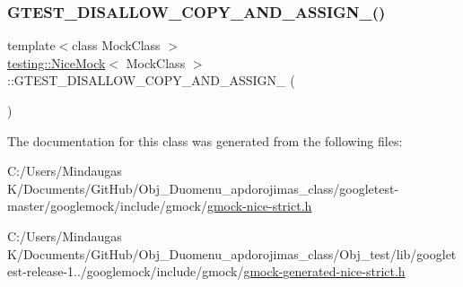 \mbox{\label{classtesting_1_1_nice_mock_aee46eca734708818a8af94624eb512dd}} 
\subsubsection{\texorpdfstring{GTEST\_DISALLOW\_COPY\_AND\_ASSIGN\_()}{GTEST\_DISALLOW\_COPY\_AND\_ASSIGN\_()}\hspace{0.1cm}{\footnotesize\ttfamily [3/3]}}
{\footnotesize\ttfamily template$<$class Mock\+Class $>$ \\
\mbox{\hyperlink{classtesting_1_1_nice_mock}{testing\+::\+Nice\+Mock}}$<$ Mock\+Class $>$\+::G\+T\+E\+S\+T\+\_\+\+D\+I\+S\+A\+L\+L\+O\+W\+\_\+\+C\+O\+P\+Y\+\_\+\+A\+N\+D\+\_\+\+A\+S\+S\+I\+G\+N\+\_\+ (\begin{DoxyParamCaption}\item[{\mbox{\hyperlink{classtesting_1_1_nice_mock}{Nice\+Mock}}$<$ Mock\+Class $>$}]{ }\end{DoxyParamCaption})\hspace{0.3cm}{\ttfamily [private]}}



The documentation for this class was generated from the following files\+:\begin{DoxyCompactItemize}
\item 
C\+:/\+Users/\+Mindaugas K/\+Documents/\+Git\+Hub/\+Obj\+\_\+\+Duomenu\+\_\+apdorojimas\+\_\+class/googletest-\/master/googlemock/include/gmock/\mbox{\hyperlink{googletest-master_2googlemock_2include_2gmock_2gmock-nice-strict_8h}{gmock-\/nice-\/strict.\+h}}\item 
C\+:/\+Users/\+Mindaugas K/\+Documents/\+Git\+Hub/\+Obj\+\_\+\+Duomenu\+\_\+apdorojimas\+\_\+class/\+Obj\+\_\+test/lib/googletest-\/release-\/1../googlemock/include/gmock/\mbox{\hyperlink{gmock-generated-nice-strict_8h}{gmock-\/generated-\/nice-\/strict.\+h}}\end{DoxyCompactItemize}
